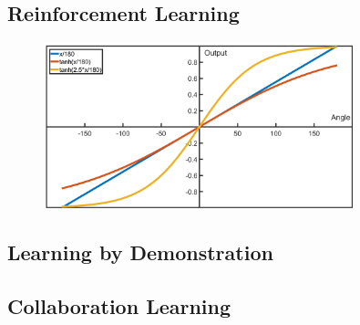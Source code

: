 \subsection{Reinforcement Learning}

\begin{figure}[h]
    \centering
    \includegraphics[width=0.8\textwidth]{06_Implementation/00_MLAgents/Images/anglePlot.png}
    \caption{} \label{06:anglePlot}
\end{figure}

\subsection{Learning by Demonstration}

\subsection{Collaboration Learning}